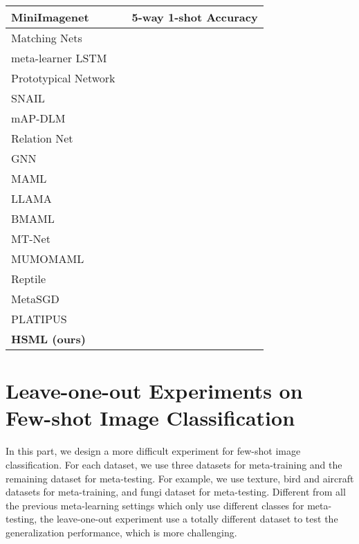 \documentclass{article}
\begin{document}
\begin{table}[h]
\label{tab:miniimagenet}
\begin{center}
\begin{tabular}{l|c}
\hline
MiniImagenet & 5-way 1-shot Accuracy  \\\hline
Matching Nets~\cite{vinyals2016matching}    &   \\
meta-learner LSTM~\cite{ravi2016optimization}    & \\
Prototypical Network~\cite{snell2017prototypical}    & \\
SNAIL~\cite{mishra2018simple}    & \\
mAP-DLM~\cite{triantafillou2017few} & \\
Relation Net~\cite{yang2018learning}    & \\
GNN~\cite{garcia2017few} &  \\\midrule
MAML~\cite{finn2017model} & \\
LLAMA~\cite{finn2017meta} & \\
BMAML~\cite{yoon2018bayesian} & \\
MT-Net~\cite{lee2018gradient} & \\
MUMOMAML~\cite{vuorio2018toward} & \\
Reptile~\cite{nichol2018reptile} & \\
MetaSGD~\cite{li2017meta} & \\
PLATIPUS~\cite{finn2018probabilistic} & \\\midrule
\textbf{HSML (ours)}    &   \\\hline
\end{tabular}
\end{center}
\end{table}

\section{Leave-one-out Experiments on Few-shot Image Classification}
\label{app:leave_one_out}
In this part, we design a more difficult experiment for few-shot image classification. For each dataset, we use three datasets for meta-training and the remaining dataset for meta-testing. For example, we use texture, bird and aircraft datasets for meta-training, and fungi dataset for meta-testing. Different from all the previous meta-learning settings which only use different classes for meta-testing, the leave-one-out experiment use a totally different dataset to test the generalization performance, which is more challenging. 
\end{document}
